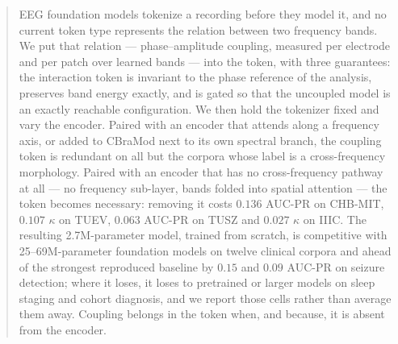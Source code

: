 \begin{abstract}
EEG foundation models tokenize a recording before they model it, and no
current token type represents the relation between two frequency bands.
We put that relation --- phase--amplitude coupling, measured per electrode
and per patch over learned bands --- into the token, with three
guarantees: the interaction token is invariant to the phase reference of
the analysis, preserves band energy exactly, and is gated so that the
uncoupled model is an exactly reachable configuration. We then hold the
tokenizer fixed and vary the encoder. Paired with an encoder that attends
along a frequency axis, or added to CBraMod next to its own spectral
branch, the coupling token is redundant on all but the corpora whose
label is a cross-frequency morphology. Paired with an encoder that has no
cross-frequency pathway at all --- no frequency sub-layer, bands folded
into spatial attention --- the token becomes necessary: removing it costs
$0.136$ AUC-PR on CHB-MIT, $0.107$ $\kappa$ on TUEV, $0.063$ AUC-PR on TUSZ
and $0.027$ $\kappa$ on IIIC. The resulting 2.7M-parameter model, trained
from scratch, is competitive with 25--69M-parameter foundation models on
twelve clinical corpora and ahead of the strongest reproduced baseline by
$0.15$ and $0.09$ AUC-PR on seizure detection; where it loses, it loses
to pretrained or larger models on sleep staging and cohort diagnosis, and
we report those cells rather than average them away. Coupling belongs in
the token when, and because, it is absent from the encoder.
\end{abstract}

